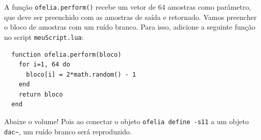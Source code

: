 \documentclass{article}
\begin{document}
A função \texttt{ofelia.perform()} recebe um vetor de 64 amostras como parâmetro, que deve ser preenchido com as amostras de saída e retornado.
Vamos preencher o bloco de amostras com um ruído branco. Para isso, adicione a seguinte função no script \texttt{meuScript.lua}:

\begin{center}
  \begin{lstlisting}
  function ofelia.perform(bloco)
    for i=1, 64 do
      bloco[i] = 2*math.random() - 1
    end
    return bloco
  end
  \end{lstlisting}
\end{center}

Abaixe o volume! Pois ao conectar o objeto \texttt{ofelia define -s11} a um objeto \texttt{dac\textasciitilde}, um ruído branco será reproduzido.








\end{document}
